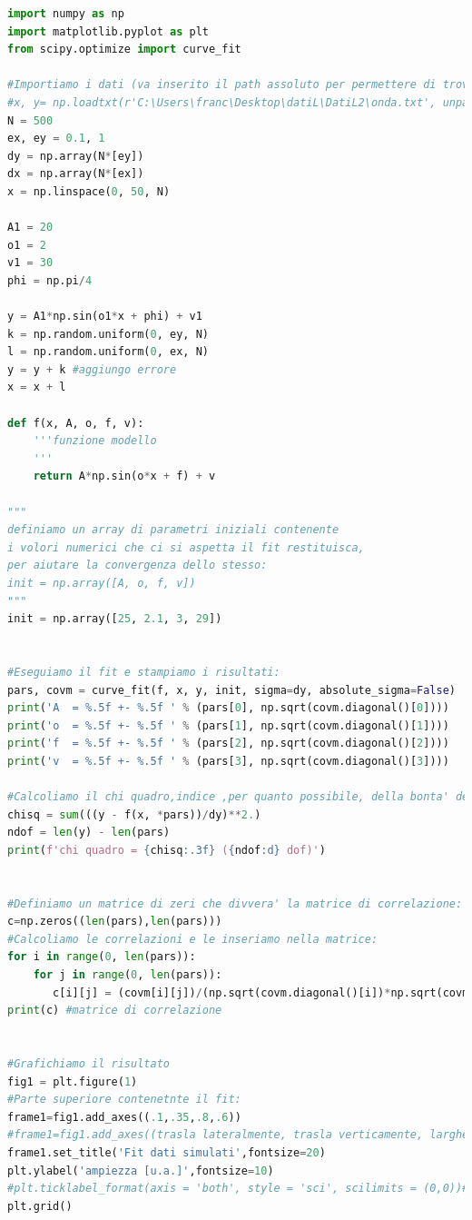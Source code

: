 \documentclass[10pt,a4paper]{article}
\begin{document}
\begin{lstlisting}[language=Python]
import numpy as np
import matplotlib.pyplot as plt
from scipy.optimize import curve_fit

#Importiamo i dati (va inserito il path assoluto per permettere di trovare) e definiamo la funzione di fit:
#x, y= np.loadtxt(r'C:\Users\franc\Desktop\datiL\DatiL2\onda.txt', unpack = True)
N = 500
ex, ey = 0.1, 1
dy = np.array(N*[ey])
dx = np.array(N*[ex])
x = np.linspace(0, 50, N)

A1 = 20
o1 = 2
v1 = 30
phi = np.pi/4

y = A1*np.sin(o1*x + phi) + v1
k = np.random.uniform(0, ey, N)
l = np.random.uniform(0, ex, N)
y = y + k #aggiungo errore
x = x + l

def f(x, A, o, f, v):
    '''funzione modello
    '''
    return A*np.sin(o*x + f) + v

"""
definiamo un array di parametri iniziali contenente
i volori numerici che ci si aspetta il fit restituisca,
per aiutare la convergenza dello stesso:
init = np.array([A, o, f, v])
"""
init = np.array([25, 2.1, 3, 29])


#Eseguiamo il fit e stampiamo i risultati:
pars, covm = curve_fit(f, x, y, init, sigma=dy, absolute_sigma=False)
print('A  = %.5f +- %.5f ' % (pars[0], np.sqrt(covm.diagonal()[0])))
print('o  = %.5f +- %.5f ' % (pars[1], np.sqrt(covm.diagonal()[1])))
print('f  = %.5f +- %.5f ' % (pars[2], np.sqrt(covm.diagonal()[2])))
print('v  = %.5f +- %.5f ' % (pars[3], np.sqrt(covm.diagonal()[3])))

#Calcoliamo il chi quadro,indice ,per quanto possibile, della bonta' del fit:
chisq = sum(((y - f(x, *pars))/dy)**2.)
ndof = len(y) - len(pars)
print(f'chi quadro = {chisq:.3f} ({ndof:d} dof)')


#Definiamo un matrice di zeri che divvera' la matrice di correlazione:
c=np.zeros((len(pars),len(pars)))
#Calcoliamo le correlazioni e le inseriamo nella matrice:
for i in range(0, len(pars)):
    for j in range(0, len(pars)):
       c[i][j] = (covm[i][j])/(np.sqrt(covm.diagonal()[i])*np.sqrt(covm.diagonal()[j]))
print(c) #matrice di correlazione


#Grafichiamo il risultato
fig1 = plt.figure(1)
#Parte superiore contenetnte il fit:
frame1=fig1.add_axes((.1,.35,.8,.6))
#frame1=fig1.add_axes((trasla lateralmente, trasla verticamente, larghezza, altezza))
frame1.set_title('Fit dati simulati',fontsize=20)
plt.ylabel('ampiezza [u.a.]',fontsize=10)
#plt.ticklabel_format(axis = 'both', style = 'sci', scilimits = (0,0))#notazione scientifica sugliassi
plt.grid()


\end{lstlisting}
\end{document}
